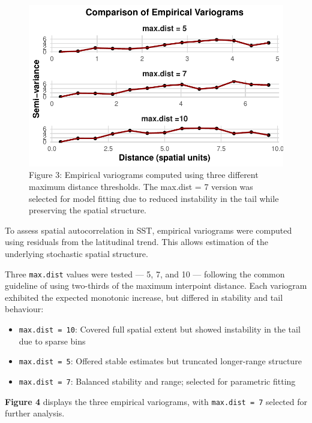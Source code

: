 \documentclass[
  11pt,
]{article}
\begin{document}
\begin{figure}[H]

{\centering \includegraphics{project_files/figure-pdf/fig-variogcompare-1.pdf}

}

\caption{Figure 3: Empirical variograms computed using three different
maximum distance thresholds. The max.dist = 7 version was selected for
model fitting due to reduced instability in the tail while preserving
the spatial structure.}

\end{figure}%

To assess spatial autocorrelation in SST, empirical variograms were
computed using residuals from the latitudinal trend. This allows
estimation of the underlying stochastic spatial structure.

Three \texttt{max.dist} values were tested --- 5, 7, and 10 ---
following the common guideline of using two-thirds of the maximum
interpoint distance. Each variogram exhibited the expected monotonic
increase, but differed in stability and tail behaviour:

\begin{itemize}
\item
  \texttt{max.dist\ =\ 10}: Covered full spatial extent but showed
  instability in the tail due to sparse bins
\item
  \texttt{max.dist\ =\ 5}: Offered stable estimates but truncated
  longer-range structure
\item
  \texttt{max.dist\ =\ 7}: Balanced stability and range; selected for
  parametric fitting
\end{itemize}

\textbf{Figure 4} displays the three empirical variograms, with
\texttt{max.dist\ =\ 7} selected for further analysis.
\end{document}
